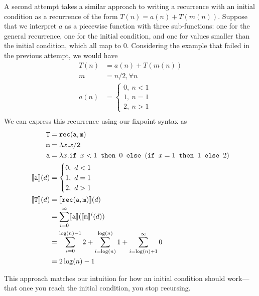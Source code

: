 A second attempt takes a similar approach to writing a recurrence with an initial condition as a recurrence of 
the form $T(n) = a(n) + T(m(n))$. Suppose that we interpret $a$ as a piecewise function with three sub-functions:
one for the general recurrence, one for the initial condition, and one for values smaller than the initial condition, which all
map to $0$. Considering the example that failed in the previous attempt, we would have
\begin{align*}
T(n) &= a(n) + T(m(n)) \\
m &= n/2, \forall n \\
a(n) &=
\begin{cases}
0, \ n < 1 \\
1, \ n = 1 \\
2, \ n > 1
\end{cases} \\
\end{align*}
We can express this recurrence using our fixpoint syntax as
\begin{align*}
\texttt{T} &= \texttt{rec}(\texttt{a},\texttt{m}) \\
\texttt{m} &= \lambda x.x/\texttt{2} \\
\texttt{a} &= \lambda x.\texttt{if } x <1 \texttt{ then } 0 \texttt{ else } (\texttt{if } x = 1 \texttt{ then } 1 \texttt{ else } 2) \\
\llbracket \texttt{a} \rrbracket(d) &= 
 \begin{cases}
0, \ d < 1 \\
1, \ d = 1 \\
2, \ d > 1 
\end{cases} \\
\llbracket \texttt{T} \rrbracket(d) &= \llbracket \texttt{rec}(\texttt{a},\texttt{m})\rrbracket(d) \\
&= \sum_{i=0}^{\infty}\llbracket \texttt{a} \rrbracket(\llbracket \texttt{m}\rrbracket^i(d)) \\
&= \sum_{i=0}^{\log(n)-1} 2 + \sum_{i=\log(n) }^{\log(n)} 1 + \sum_{i = \log(n) + 1}^{\infty} 0 \\
&= 2\log(n) - 1
\end{align*}

This approach matches our intuition for how an initial condition should work---that once you reach the initial condition,
you stop recursing. 

